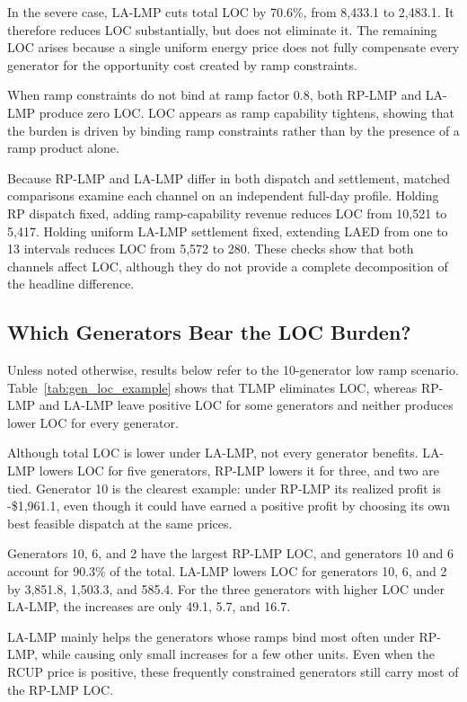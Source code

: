 \documentclass[conference]{IEEEtran}
\begin{document}
In the severe case, LA-LMP cuts total LOC by 70.6\%, from 8{,}433.1 to 2{,}483.1. It therefore reduces LOC substantially, but does not eliminate it. The remaining LOC arises because a single uniform energy price does not fully compensate every generator for the opportunity cost created by ramp constraints.

When ramp constraints do not bind at ramp factor 0.8, both RP-LMP and LA-LMP produce zero LOC. LOC appears as ramp capability tightens, showing that the burden is driven by binding ramp constraints rather than by the presence of a ramp product alone.

Because RP-LMP and LA-LMP differ in both dispatch and settlement, matched comparisons examine each channel on an independent full-day profile. Holding RP dispatch fixed, adding ramp-capability revenue reduces LOC from 10{,}521 to 5{,}417. Holding uniform LA-LMP settlement fixed, extending LAED from one to 13 intervals reduces LOC from 5{,}572 to 280. These checks show that both channels affect LOC, although they do not provide a complete decomposition of the headline difference.

\subsection{Which Generators Bear the LOC Burden?}
Unless noted otherwise, results below refer to the 10-generator low ramp scenario. Table~\ref{tab:gen_loc_example} shows that TLMP eliminates LOC, whereas RP-LMP and LA-LMP leave positive LOC for some generators and neither produces lower LOC for every generator.

Although total LOC is lower under LA-LMP, not every generator benefits. LA-LMP lowers LOC for five generators, RP-LMP lowers it for three, and two are tied. Generator 10 is the clearest example: under RP-LMP its realized profit is \mbox{-\$1{,}961.1}, even though it could have earned a positive profit by choosing its own best feasible dispatch at the same prices.

Generators 10, 6, and 2 have the largest RP-LMP LOC, and generators 10 and 6 account for 90.3\% of the total. LA-LMP lowers LOC for generators 10, 6, and 2 by 3{,}851.8, 1{,}503.3, and 585.4. For the three generators with higher LOC under LA-LMP, the increases are only 49.1, 5.7, and 16.7.

LA-LMP mainly helps the generators whose ramps bind most often under RP-LMP, while causing only small increases for a few other units. Even when the RCUP price is positive, these frequently constrained generators still carry most of the RP-LMP LOC.
\end{document}
